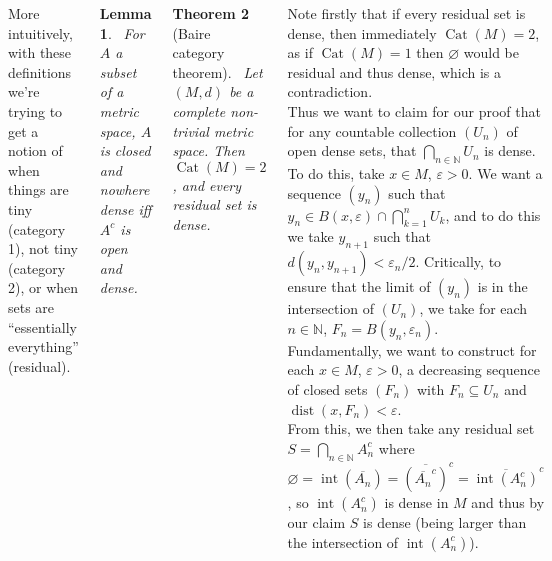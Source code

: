 \documentclass{tikzposter} %
\DeclareMathOperator{\Int}{int}
\DeclareMathOperator{\Cat}{Cat}
\DeclareMathOperator{\dist}{dist}
\newtheorem{theorem}{Theorem}
\newtheorem{lemma}[theorem]{Lemma}
\begin{document}
\begin{columns}
{{      More intuitively, with these definitions we're trying to get a notion of when things are tiny (category 1), not tiny (category 2), or when sets are ``essentially everything'' (residual). \\

      \begin{lemma}
      \ For $A$ a subset of a metric space, $A$ is closed and nowhere dense iff $A^{c}$ is open and dense.
      \end{lemma}
      \hphantom{}

      \begin{theorem}[Baire category theorem]
      \ Let $(M, d)$ be a complete non-trivial metric space. Then $\Cat(M) = 2$, and every residual set is dense.
      \end{theorem}
      \hphantom{}

      Note firstly that if every residual set is dense, then immediately $\Cat(M) = 2$, as if $\Cat(M) = 1$ then $\varnothing$ would be residual and thus dense, which is a contradiction. \\

      Thus we want to claim for our proof that for any countable collection $(U_{n})$ of open dense sets, that $\bigcap_{n \in \mathbb{N}} U_{n}$ is dense. To do this, take $x \in M$, $\varepsilon > 0$. We want a sequence $(y_{n})$ such that $y_{n} \in B(x, \varepsilon) \cap \bigcap_{k=1}^{n} U_{k}$, and to do this we take $y_{n+1}$ such that $d(y_{n}, y_{n+1}) < \varepsilon_{n}/2$. Critically, to ensure that the limit of $(y_{n})$ is in the intersection of $(U_{n})$, we take for each $n \in \mathbb{N}$, $F_{n} = B(y_{n}, \varepsilon_{n})$. \\

      Fundamentally, we want to construct for each $x \in M$, $\varepsilon > 0$, a decreasing sequence of closed sets $(F_{n})$ with $F_{n} \subseteq U_{n}$ and $\dist(x, F_{n}) < \varepsilon$. \\

      From this, we then take any residual set $S = \bigcap_{n \in \mathbb{N}} A_{n}^{c}$ where $\varnothing = \Int(\overline{A_{n}}) = \overline{(\overline{A_{n}}^{c})}^{c} = \overline{\Int(A_{n}^{c})}^{c}$, so $\Int(A_{n}^{c})$ is dense in $M$ and thus by our claim $S$ is dense (being larger than the intersection of $\Int(A_{n}^{c})$).
    }
    \hphantom{}

    }
\end{columns}
\end{document}
